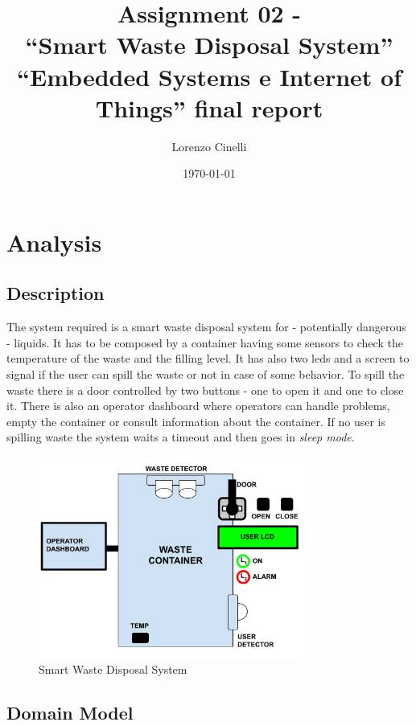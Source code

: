 \documentclass[a4paper,12pt]{report}
\title{Assignment 02 - \\``Smart Waste Disposal System''\\
    \large ``Embedded Systems e Internet of Things'' final report}
\author{Lorenzo Cinelli}
\date{\today}
\begin{document}
\maketitle

\tableofcontents

\chapter{Analysis}

    \section{Description}

        The system required is a smart waste disposal system for - potentially dangerous - liquids. It has to be composed by a container having some sensors to check the temperature of the waste and the filling level. It has also two leds and a screen to signal if the user can spill the waste or not in case of some behavior. To spill the waste there is a door controlled by two buttons - one to open it and one to close it. 
        There is also an operator dashboard where operators can handle problems, empty the container or consult information about the container. If no user is spilling waste the system waits a timeout and then goes in \textit{sleep mode}. 

        \begin{figure}[H]
        	\centering{}
        	\includegraphics[width=250pt]{img/Assignment-02_SWDS-Domain.png}
        	\caption{Smart Waste Disposal System}
        	\label{img:system}
        \end{figure}

    \section{Domain Model}
    
\end{document}
